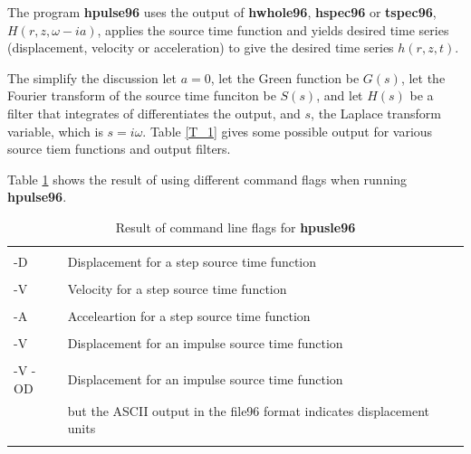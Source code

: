 \documentclass{article}
\begin{document}
The program {\bf hpulse96} uses the output of {\bf hwhole96},  {\bf hspec96} or {\bf tspec96}, $ H(r,z, \omega -ia )$,  applies the source time function and yields desired time series (displacement, velocity or acceleration) to give the desired time series $h(r,z,t)$.

The simplify the discussion let $a = 0 $, let the Green function be $G(s)$, let the Fourier transform of the source time funciton be $S(s)$, and let $H(s)$ be a filter that integrates of differentiates the output, and
$s$, the Laplace transform variable, which is $s = i \omega$. Table \ref{T_1} gives some possible output for various source tiem functions and output filters.

\begin{table}
\label{T_1}
\caption{Operations}
\begin{tabular} { l l l l }
\hline
$S(s)$ & ${H(s)$ & Motion & Description \\
\hline
\\
1 & 1         & G(s) $ & displacement from impulse \\
\\
$\frac{1}{s}$ & 1 & $\frac{1}{s} G(s)$  &  displacement from step function \\
\\
$\frac{1}{s}$ & s &  G(s)$ $  & velocity from step function \\
\\
\hline
\end{tabular}
\end{table}

Table \ref{T_2} shows the result of using different command flags when running {\bf hpulse96}.

\begin{table}
\label{T_2}
\caption{Result of command line flags for {\bf hpusle96}}
\begin{tabular} { l l  }
\hline
\\
-D &  Displacement for a step source time function\\ 
\\
-V &  Velocity for a step source time function \\
\\
-A &  Acceleartion for a step source time function\\
\\
-V &  Displacement for an impulse source time function \\
\\
-V -OD  & Displacement for an impulse source time function \\
 & but the ASCII output in the file96 format indicates displacement units \\
\\
\hline
\end{tabular}
\end{table}
\end{document}
